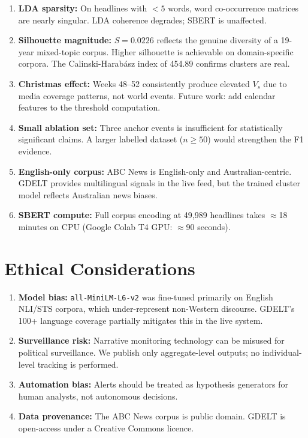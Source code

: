\documentclass[12pt,a4paper]{article}
\begin{document}
\begin{enumerate}[leftmargin=2em]
    \item \textbf{LDA sparsity:} On headlines with $<5$ words, word co-occurrence
          matrices are nearly singular. LDA coherence degrades; SBERT is unaffected.
    \item \textbf{Silhouette magnitude:} $S = 0.0226$ reflects the genuine diversity of
          a 19-year mixed-topic corpus. Higher silhouette is achievable on domain-specific
          corpora. The Calinski-Harabász index of 454.89 confirms clusters are real.
    \item \textbf{Christmas effect:} Weeks 48--52 consistently produce elevated $V_s$
          due to media coverage patterns, not world events. Future work: add calendar
          features to the threshold computation.
    \item \textbf{Small ablation set:} Three anchor events is insufficient for statistically
          significant claims. A larger labelled dataset ($n \geq 50$) would strengthen
          the F1 evidence.
    \item \textbf{English-only corpus:} ABC News is English-only and Australian-centric.
          GDELT provides multilingual signals in the live feed, but the trained cluster model
          reflects Australian news biases.
    \item \textbf{SBERT compute:} Full corpus encoding at 49,989 headlines takes
          $\approx$18 minutes on CPU (Google Colab T4 GPU: $\approx$90 seconds).
\end{enumerate}

\section{Ethical Considerations}

\begin{enumerate}[leftmargin=2em]
    \item \textbf{Model bias:} \texttt{all-MiniLM-L6-v2} was fine-tuned primarily on
          English NLI/STS corpora, which under-represent non-Western discourse.
          GDELT's 100+ language coverage partially mitigates this in the live system.
    \item \textbf{Surveillance risk:} Narrative monitoring technology can be misused
          for political surveillance. We publish only aggregate-level outputs; no
          individual-level tracking is performed.
    \item \textbf{Automation bias:} Alerts should be treated as hypothesis generators
          for human analysts, not autonomous decisions.
    \item \textbf{Data provenance:} The ABC News corpus is public domain. GDELT is
          open-access under a Creative Commons licence.
\end{enumerate}
\end{document}
